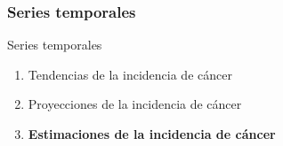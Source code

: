 \documentclass{beamer}
\begin{document}

\begin{frame}\frametitle{Series temporales}
	\begin{block}{Series temporales}
		\begin{enumerate}
			\item Tendencias de la incidencia de cáncer\\[2ex]
			\item Proyecciones de la incidencia de cáncer\\[2ex]
			\item \textbf{Estimaciones de la incidencia de cáncer}\\[2ex]
		\end{enumerate}
	\end{block}
\end{frame}

\end{document}
